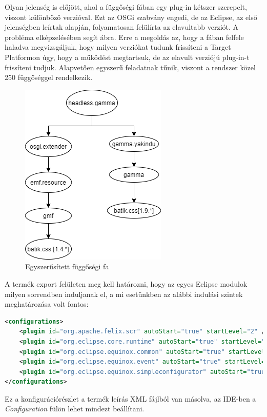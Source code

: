 Olyan jelenség is előjött, ahol a függőségi fában egy plug-in kétszer szerepelt, viszont különböző verzióval. Ezt az OSGi szabvány engedi, de az Eclipse, az első jelenségben leírtak alapján, folyamatosan felülírta az elavultabb verziót. A probléma elképzelésében segít   ábra. Erre a megoldás az, hogy a fában felfele haladva megvizsgáljuk, hogy milyen verziókat tudunk frissíteni a Target Platformon úgy, hogy a működést megtartsuk, de az elavult verziójú plug-in-t frissíteni tudjuk. Alapvetően egyszerű feladatnak tűnik, viszont a rendszer közel 250 függőséggel rendelkezik.

\begin{figure}[!ht]
	\centering
	\includegraphics[keepaspectratio]{figures/depend.png}
	\caption{Egyszerűsített függőségi fa}
	\label{fig:depend}
\end{figure}

A termék export felületen meg kell határozni, hogy az egyes Eclipse modulok milyen sorrendben induljanak el, a mi esetünkben az alábbi indulási szintek meghatározása volt fontos:
\begin{lstlisting}[language=XML]
<configurations>
	<plugin id="org.apache.felix.scr" autoStart="true" startLevel="2" />
	<plugin id="org.eclipse.core.runtime" autoStart="true" startLevel="0" />
	<plugin id="org.eclipse.equinox.common" autoStart="true" startLevel="2" />
	<plugin id="org.eclipse.equinox.event" autoStart="true" startLevel="2" />
	<plugin id="org.eclipse.equinox.simpleconfigurator" autoStart="true" startLevel="1" />
</configurations>
\end{lstlisting}
Ez a konfigurációrészlet a termék leírás XML fájlból van másolva, az IDE-ben a \textit{Configuration} fülön lehet mindezt beállítani.

